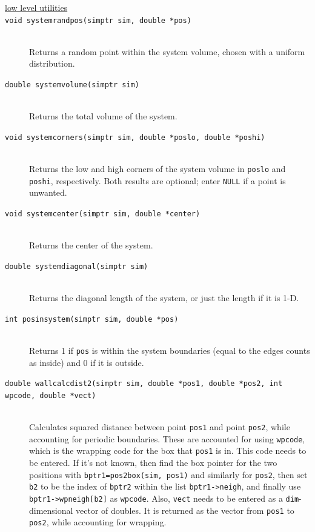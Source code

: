\documentclass {scrbook}
\newcommand {\ttt} {\texttt}
\begin{document}
\begin{description}

\item[\underline{low level utilities}]

\item[\ttt{void systemrandpos(simptr sim, double *pos)}]
\hfill \\
Returns a random point within the system volume, chosen with a uniform distribution.

\item[\ttt{double systemvolume(simptr sim)}]
\hfill \\
Returns the total volume of the system.

\item[\ttt{void systemcorners(simptr sim, double *poslo, double *poshi)}]
\hfill \\
Returns the low and high corners of the system volume in \ttt{poslo} and \ttt{poshi}, respectively. Both results are optional; enter \ttt{NULL} if a point is unwanted.

\item[\ttt{void systemcenter(simptr sim, double *center)}]
\hfill \\
Returns the center of the system.

\item[\ttt{double systemdiagonal(simptr sim)}]
\hfill \\
Returns the diagonal length of the system, or just the length if it is 1-D.

\item[\ttt{int posinsystem(simptr sim, double *pos)}]
\hfill \\
Returns 1 if \ttt{pos} is within the system boundaries (equal to the edges counts as inside) and 0 if it is outside.

\item[\ttt{double wallcalcdist2(simptr sim, double *pos1, double *pos2, int wpcode, double *vect)}]
\hfill \\
Calculates squared distance between point \ttt{pos1} and point \ttt{pos2}, while accounting for periodic boundaries. These are accounted for using \ttt{wpcode}, which is the wrapping code for the box that \ttt{pos1} is in. This code needs to be entered. If it's not known, then find the box pointer for the two positions with \ttt{bptr1=pos2box(sim, pos1)} and similarly for \ttt{pos2}, then set \ttt{b2} to be the index of \ttt{bptr2} within the list \ttt{bptr1->neigh}, and finally use \ttt{bptr1->wpneigh[b2]} as \ttt{wpcode}. Also, \ttt{vect} needs to be entered as a \ttt{dim}-dimensional vector of doubles. It is returned as the vector from \ttt{pos1} to \ttt{pos2}, while accounting for wrapping.


\end{description}
\end{document}
